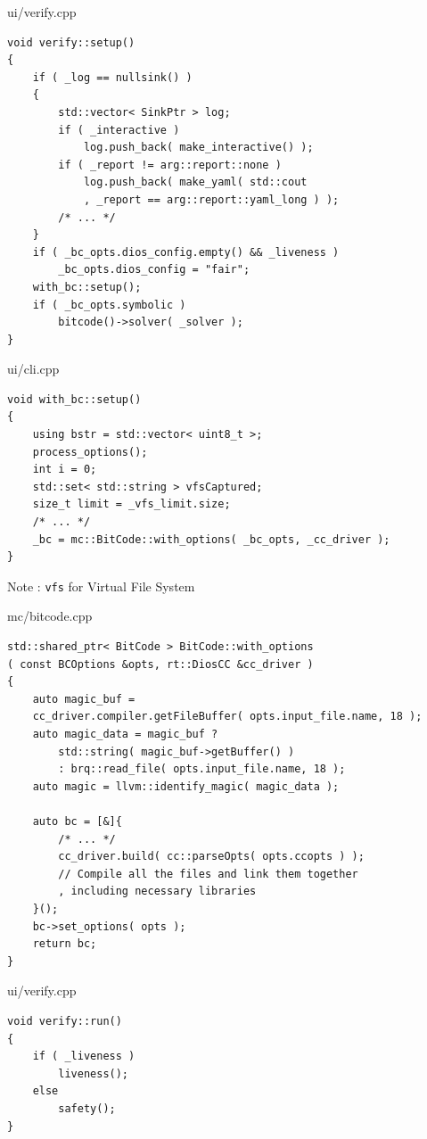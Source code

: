 \documentclass[12pt]{beamer}
\newcommand{\code}[1]{\texttt{#1}}
\begin{document}

\begin{frame}[fragile]{ui/verify.cpp}
\begin{lstlisting}[basicstyle=\footnotesize\ttfamily]
void verify::setup()
{
    if ( _log == nullsink() )
    {
        std::vector< SinkPtr > log;
        if ( _interactive )
            log.push_back( make_interactive() );
        if ( _report != arg::report::none )
            log.push_back( make_yaml( std::cout
            , _report == arg::report::yaml_long ) );
        /* ... */
    }
    if ( _bc_opts.dios_config.empty() && _liveness )
        _bc_opts.dios_config = "fair";
    with_bc::setup();
    if ( _bc_opts.symbolic )
        bitcode()->solver( _solver );
}
\end{lstlisting}
\end{frame}

\begin{frame}[fragile]{ui/cli.cpp}
\begin{lstlisting}[basicstyle=\footnotesize\ttfamily]
void with_bc::setup()
{
    using bstr = std::vector< uint8_t >;
    process_options();
    int i = 0;
    std::set< std::string > vfsCaptured;
    size_t limit = _vfs_limit.size;
    /* ... */
    _bc = mc::BitCode::with_options( _bc_opts, _cc_driver );
}
\end{lstlisting}
Note : \code{vfs} for Virtual File System
\end{frame}

\begin{frame}[fragile]{mc/bitcode.cpp}
\begin{lstlisting}[basicstyle=\footnotesize\ttfamily]
std::shared_ptr< BitCode > BitCode::with_options
( const BCOptions &opts, rt::DiosCC &cc_driver )
{
    auto magic_buf = 
    cc_driver.compiler.getFileBuffer( opts.input_file.name, 18 );
    auto magic_data = magic_buf ?
        std::string( magic_buf->getBuffer() )
        : brq::read_file( opts.input_file.name, 18 );
    auto magic = llvm::identify_magic( magic_data );
    
    auto bc = [&]{
        /* ... */
        cc_driver.build( cc::parseOpts( opts.ccopts ) );
        // Compile all the files and link them together
        , including necessary libraries
    }();
    bc->set_options( opts );
    return bc;
}
\end{lstlisting}
\end{frame}


\begin{frame}[fragile]{ui/verify.cpp}
\begin{lstlisting}[basicstyle=\normalsize\ttfamily]
void verify::run()
{
    if ( _liveness )
        liveness();
    else
        safety();
}
\end{lstlisting}
\end{frame}
\end{document}
